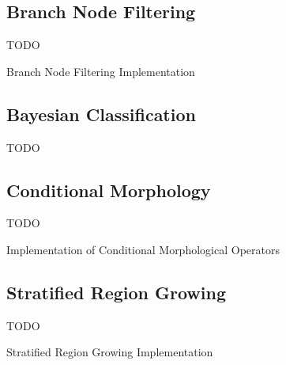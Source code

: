 \subsection{Branch Node Filtering}

TODO

\begin{stulisting}[p]
\caption{Branch Node Filtering Implementation}
\label{code:featureid-techniques-branchnodefiltering}

\end{stulisting}

\subsection{Bayesian Classification}

TODO

\subsection{Conditional Morphology}

TODO

\begin{stulisting}[p]
\caption{Implementation of Conditional Morphological Operators}
\label{code:featureid-techniques-conditionalmorphology}

\end{stulisting}

\subsection{Stratified Region Growing}

TODO

\begin{stulisting}[p]
\caption{Stratified Region Growing Implementation}
\label{code:featureid-techniques-stratifiedregiongrowing}

\end{stulisting}

